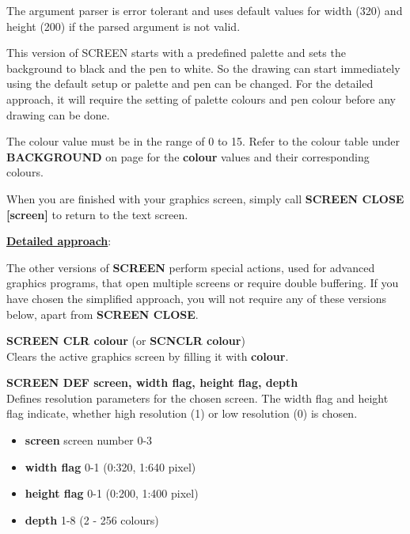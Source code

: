 \begin{description}[leftmargin=2cm,style=nextline]
               The argument parser is error tolerant and uses default values
               for width (320) and height (200)
               if the parsed argument is not valid.

               This version of SCREEN starts with a predefined
               palette and sets the background to black and the pen to white.
               So the drawing can start immediately using the default setup
               or palette and pen can be changed. For the detailed approach,
               it will require the setting of palette colours and pen colour
               before any drawing can be done.

               The colour value must be in the range of 0 to 15.
               Refer to the colour table under {\bf BACKGROUND} on page
               \pageref{colourtable} for the {\bf colour} values and their corresponding colours.

               When you are finished with your graphics screen, simply call
               {\bf SCREEN CLOSE [screen]} to return to the text screen.

  \underline{{\bf Detailed approach}}:

               The other versions of
               {\bf SCREEN} perform special actions, used for
               advanced graphics programs, that open multiple screens
               or require double buffering. If you have chosen the simplified
               approach, you will not require any of these versions below,
               apart from {\bf SCREEN CLOSE}.

                {\bf SCREEN CLR colour} (or {\bf SCNCLR colour}) \\
                Clears the active graphics screen by filling it with {\bf colour}.

                {\bf SCREEN DEF screen, width flag, height flag, depth} \\
                Defines resolution parameters for the chosen
                screen. The width flag and height flag indicate,
                whether high resolution (1) or low resolution (0) is chosen.

                \begin{itemize}
                  \item {\bf screen} screen number 0-3
                  \item {\bf width flag} 0-1 (0:320, 1:640 pixel)
                  \item {\bf height flag} 0-1 (0:200, 1:400 pixel)
                  \item {\bf depth} 1-8 (2 - 256 colours)
                \end{itemize}


\end{description}

